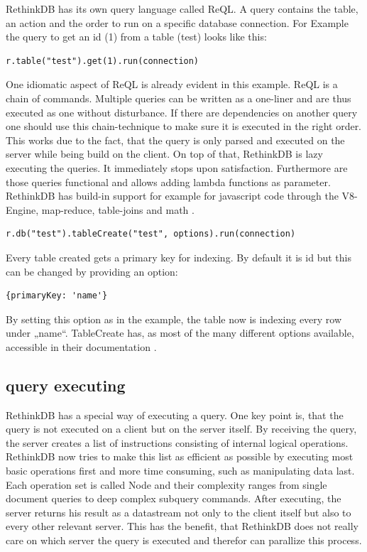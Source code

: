 RethinkDB has its own query language called ReQL. A query contains the table, an action and the order to run on a specific database connection. For Example the query to get an id (1) from a table (test) looks like this:

\begin{lstlisting}[frame=single, caption=get document from Database  (javascript driver), label=rget]
r.table("test").get(1).run(connection)
\end{lstlisting}

One idiomatic aspect of ReQL is already evident in this example. ReQL is a chain of commands. Multiple queries can be written as a one-liner and are thus executed as one without disturbance. If there are dependencies on another query one should use this chain-technique to make sure it is executed in the right order. This works due to the fact, that the query is only parsed and executed on the server while being build on the client. On top of that, RethinkDB is lazy executing the queries.  It immediately stops upon satisfaction. 
Furthermore are those queries functional and allows adding lambda functions as parameter. RethinkDB has build-in support for example for javascript code through the V8-Engine, map-reduce, table-joins and math \cite{reql}.

\begin{lstlisting}[frame=single, caption=create the table 'test', label=createTable]
r.db("test").tableCreate("test", options).run(connection)
\end{lstlisting}

Every table created gets a primary key for indexing. By default it is id but this can be changed by providing an option:
\begin{lstlisting}[frame=single, caption=options for create table, label=cTableOptions]
{primaryKey: 'name'}
\end{lstlisting}

By setting this option as in the example, the table now is indexing every row under „name“.
TableCreate has, as most of the  many different options available, accessible in their documentation \cite{tableCreate}. 

\subsection{query executing}

RethinkDB has a special way of executing a query. One key point is, that the query is not executed on a client but on the server itself. By receiving the query, the server creates a list of instructions consisting of internal logical operations. RethinkDB now tries to make this list as efficient as possible by executing most basic operations first and more time consuming, such as manipulating data last. Each operation set is called Node and their complexity ranges from single document queries to deep complex subquery commands. After executing, the server returns his result as a datastream not only to the client itself but also to every other relevant server. This has the benefit, that RethinkDB does not really care on which server the query is executed and therefor can parallize this process.
\cite["How does RethinkDB execute queries?"]{RethinkQE}

